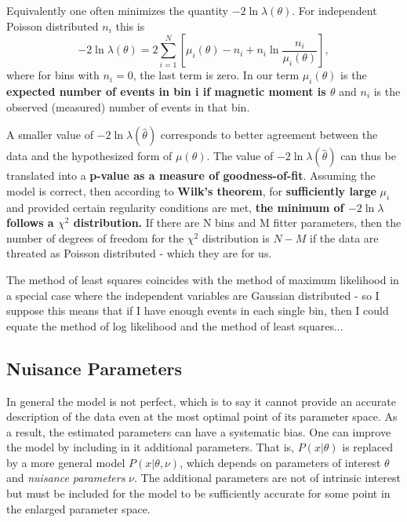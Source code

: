 Equivalently one often minimizes the quantity $-2\ln\lambda\left(\theta\right)$. For independent Poisson distributed $n_i$ this is
\begin{equation}
-2\ln\lambda\left(\theta\right)=2\sum_{i=1}^{N}\left[\mu_i\left(\theta\right)-n_i+n_i\ln\frac{n_i}{\mu_i\left(\theta\right)}\right],
\end{equation}
where for bins with $n_i=0$, the last term is zero. In our term $\mu_i\left(\theta\right)$ is the \textbf{expected number of events in bin i if magnetic moment is $\theta$} and $n_i$ is the observed (measured) number of events in that bin.

A smaller value of $-2\ln\lambda\left(\hat{\theta}\right)$ corresponds to better agreement between the data and the hypothesized form of $\mu\left(\theta\right)$. The value of $-2\ln\lambda\left(\hat{\theta}\right)$ can thus be translated into a \textbf{p-value as a measure of goodness-of-fit}. Assuming the model is correct, then according to \textbf{Wilk's theorem}, for \textbf{sufficiently large} $\mu_i$ and provided certain regularity conditions are met, \textbf{the minimum of $-2\ln\lambda$ follows a $\chi^2$ distribution.} If there are N bins and M fitter parameters, then the number of degrees of freedom for the $\chi^2$ distribution is $N-M$ if the data are threated as Poisson distributed - which they are for us.

The method of least squares coincides with the method of maximum likelihood in a special case where the independent variables are Gaussian distributed - so I suppose this means that if I have enough events in each single bin, then I could equate the method of log likelihood and the method of least squares...

\subsection{Nuisance Parameters}
In general the model is not perfect, which is to say it cannot provide an accurate description of the data even at the most optimal point of its parameter space. As a result, the estimated parameters can have a systematic bias. One can improve the model by including in it additional parameters. That is, $P\left(x|\theta\right)$ is replaced by a more general model $P\left(x|\theta,\nu\right)$, which depends on parameters of interest $\theta$ and \textit{nuisance parameters} $\nu$. The additional parameters are not of intrinsic interest but must be included for the model to be sufficiently accurate for some point in the enlarged parameter space.

